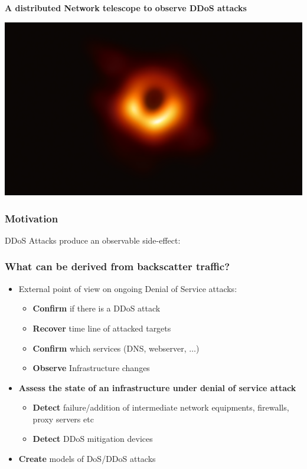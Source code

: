\documentclass{beamer}
\begin{document}
\begin{frame}
        \frametitle{}
        \begin{center}
         {\bf A distributed Network telescope to observe DDoS attacks}
        \end{center}
        \vspace{10pt}
        \begin{center}
          \includegraphics[width=.7\textwidth]{../../preso/03-PassTheSalt/eventhorizon.png}
        \end{center}
\end{frame}

\begin{frame}
        \frametitle{Motivation}
        DDoS Attacks produce an observable side-effect:
        \begin{center}
          \scalebox{0.8}{}
        \end{center}
\end{frame}

\begin{frame}
\frametitle{What can be derived from backscatter traffic?}

\begin{itemize}
    \item External point of view on ongoing Denial of Service attacks:
\begin{itemize}
    \item {\bf Confirm} if there is a DDoS attack
    \item {\bf Recover} time line of attacked targets
    \item {\bf Confirm} which services (DNS, webserver, $\dots$)
    \item {\bf Observe} Infrastructure changes
\end{itemize}
    \item {\bf Assess the state of an infrastructure under denial of service attack}
    \begin{itemize}
        \item {\bf Detect} failure/addition of  intermediate network equipments, firewalls, proxy servers etc
        \item {\bf Detect} DDoS mitigation devices
    \end{itemize}
    \item {\bf Create} models of DoS/DDoS attacks
\end{itemize}
\end{frame}
\end{document}
